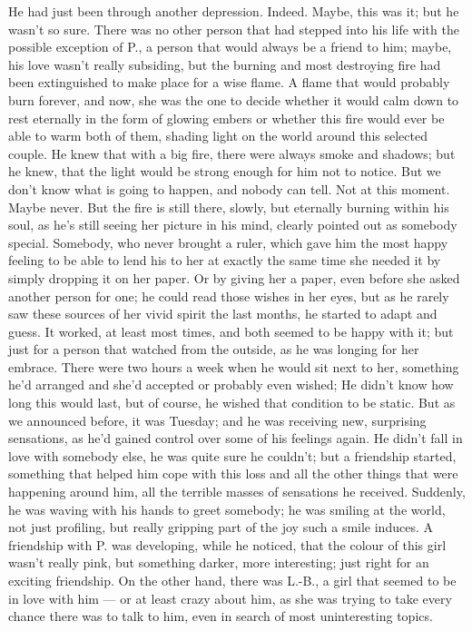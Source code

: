 He had just been through another depression. 
Indeed. 
Maybe, this was it; but he wasn't so sure. There was no other person that had stepped into his life with the possible exception of P., a person that would always be a friend to him; maybe, his love wasn't really subsiding, but the burning and most destroying fire had been extinguished to make place for a wise flame. A flame that would probably burn forever, and now, she was the one to decide whether it would calm down to rest eternally in the form of glowing embers or whether this fire would ever be able to warm both of them, shading light on the world around this selected couple. 
He knew that with a big fire, there were always smoke and shadows; but he knew, that the light would be strong enough for him not to notice. 
But we don't know what is going to happen, and nobody can tell. 
Not at this moment. 
Maybe never. 
But the fire is still there, slowly, but eternally burning within his soul, as he's still seeing her picture in his mind, clearly pointed out as somebody special. 
Somebody, who never brought a ruler, which gave him the most happy feeling to be able to lend his to her at exactly the same time she needed it by simply dropping it on her paper. 
Or by giving her a paper, even before she asked another person for one; he could read those wishes in her eyes, but as he rarely saw these sources of her vivid spirit the last months, he started to adapt and guess. 
It worked, at least most times, and both seemed to be happy with it; but just for a person that watched from the outside, as he was longing for her embrace. 
There were two hours a week when he would sit next to her, something he'd arranged and she'd accepted or probably even wished; He didn't know how long this would last, but of course, he wished that condition to be static. 
But as we announced before, it was Tuesday; and he was receiving new, surprising sensations, as he'd gained control over some of his feelings again. 
He didn't fall in love with somebody else, he was quite sure he couldn't; but a friendship started, something that helped him cope with this loss and all the other things that were happening around him, all the terrible masses of sensations he received. 
Suddenly, he was waving with his hands to greet somebody; he was smiling at the world, not just profiling, but really gripping part of the joy such a smile induces. A friendship with P. was developing, while he noticed, that the colour of this girl wasn't really pink, but something darker, more interesting; just right for an exciting friendship. 
On the other hand, there was L.-B., a girl that seemed to be in love with him --- or at least crazy about him, as she was trying to take every chance there was to talk to him, even in search of most uninteresting topics. 
